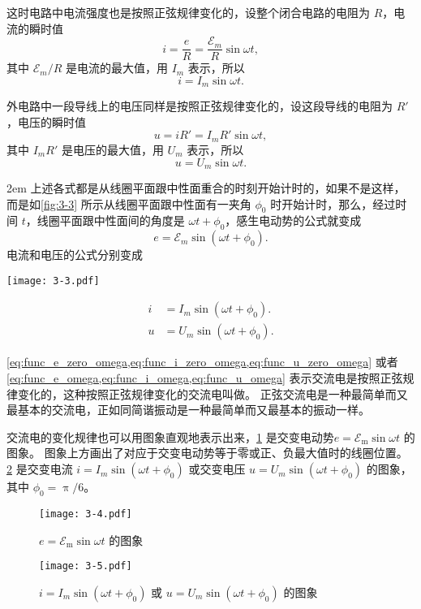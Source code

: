 这时电路中电流强度也是按照正弦规律变化的，设整个闭合电路的电阻为 $R$，电流的瞬时值
\[i=\frac{e}{R}=\frac{\mathcal{E}_m}{R} \sin\omega t,\]
其中 $\mathcal{E}_m/R$ 是电流的最大值，用 $I_m$ 表示，所以
\begin{equation}
  \label{eq:func_i_zero_omega}
  i=I_m \sin\omega t.
\end{equation}

外电路中一段导线上的电压同样是按照正弦规律变化的，设这段导线的电阻为 $R'$，电压的瞬时值
\[u=iR'=I_mR'\sin\omega t,\]
其中 $I_mR'$ 是电压的最大值，用 $U_m$ 表示，所以
\begin{equation}
  \label{eq:func_u_zero_omega}
  u=U_m \sin\omega t.
\end{equation}

\medskip\noindent
\begin{minipage}{0.5\linewidth}\parindent2em
上述各式都是从线圈平面跟中性面重合的时刻开始计时的，如果不是这样，而是如\cref{fig:3-3} 所示从线圈平面跟中性面有一夹角 $\phi_0$ 时开始计时，那么，经过时间 $t$，线圈平面跟中性面间的角度是 $\omega t+\phi_0$，感生电动势的公式就变成
\begin{equation}
  \label{eq:func_e_omega}
  e=\mathcal{E}_m \sin (\omega t+\phi_0).
\end{equation}
电流和电压的公式分别变成
\end{minipage}\hfill
\begin{minipage}{0.45\linewidth}\centering
  \begin{figurehere}
    \texttt{[image: 3-3.pdf]}
    \caption{}\label{fig:3-3}
  \end{figurehere}
\end{minipage}\par\medskip

\begin{align}
  \label{eq:func_i_omega} i&=I_m\sin (\omega t+\phi_0). \\
  \label{eq:func_u_omega} u&=U_m\sin (\omega t+\phi_0).
\end{align}

\cref{eq:func_e_zero_omega,eq:func_i_zero_omega,eq:func_u_zero_omega} 或者\cref{eq:func_e_omega,eq:func_i_omega,eq:func_u_omega} 表示交流电是按照正弦规律变化的，这种按照正弦规律变化的交流电叫做。
正弦交流电是一种最简单而又最基本的交流电，正如同简谐振动是一种最简单而又最基本的振动一样。
	
交流电的变化规律也可以用图象直观地表示出来，\cref{fig:3-4} 是交变电动势$e=\mathcal{E}_\text{m} \sin \omega t$ 的图象。
图象上方画出了对应于交变电动势等于零或正、负最大值时的线圈位置。
\cref{fig:3-5} 是交变电流 $i=I_m\sin(\omega t+\phi_0)$ 或交变电压 $u=U_m\sin(\omega t+\phi_0)$ 的图象，其中 $\phi_0=\uppi/6$。
\begin{figure}
  \texttt{[image: 3-4.pdf]}
  \caption{$e=\mathcal{E}_\text{m} \sin \omega t$ 的图象}\label{fig:3-4}
\end{figure}
\begin{figure}
  \texttt{[image: 3-5.pdf]}
  \caption{$i=I_m\sin(\omega t+\phi_0)$ 或 $u=U_m\sin(\omega t+\phi_0)$ 的图象}\label{fig:3-5}
\end{figure}

